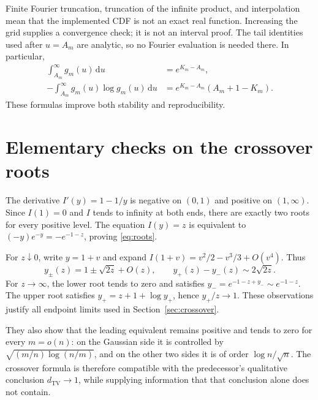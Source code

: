 \documentclass[11pt,a4paper]{article}
\numberwithin{equation}{section}
\theoremstyle{definition}
\theoremstyle{remark}
\newcommand{\TV}{d_{\mathrm{TV}}}
\newcommand{\dd}{\mathrm d}
\begin{document}
Finite Fourier truncation, truncation of the infinite product, and
interpolation mean that the implemented CDF is not an exact real
function. Increasing the grid supplies a convergence check; it is not
an interval proof. The tail identities used after $u=A_m$ are analytic,
so no Fourier evaluation is needed there. In particular,
\begin{align*}
\int_{A_m}^\infty g_m(u)\,\dd u&=e^{K_m-A_m},\\
-\int_{A_m}^\infty g_m(u)\log g_m(u)\,\dd u
 &=e^{K_m-A_m}(A_m+1-K_m).
\end{align*}
These formulas improve both stability and reproducibility.

\section{Elementary checks on the crossover roots}
\label{app:roots}

The derivative $I'(y)=1-1/y$ is negative on $(0,1)$ and positive on
$(1,\infty)$. Since $I(1)=0$ and $I$ tends to infinity at both ends,
there are exactly two roots for every positive level. The equation
$I(y)=z$ is equivalent to $(-y)e^{-y}=-e^{-1-z}$, proving
\eqref{eq:roots}.

For $z\downarrow0$, write $y=1+v$ and expand
$I(1+v)=v^2/2-v^3/3+O(v^4)$. Thus
\[
y_\pm(z)=1\pm\sqrt{2z}+O(z),\qquad
 y_+(z)-y_-(z)\sim2\sqrt{2z}.
\]
For $z\to\infty$, the lower root tends to zero and satisfies
$y_-=e^{-1-z+y_-}\sim e^{-1-z}$. The upper root satisfies
$y_+=z+1+\log y_+$, hence $y_+/z\to1$. These observations justify all
endpoint limits used in Section~\ref{sec:crossover}.

They also show that the leading equivalent remains positive and tends
to zero for every $m=o(n)$: on the Gaussian side it is controlled by
$\sqrt{(m/n)\log(n/m)}$, and on the other two sides it is of order
$\log n/\sqrt n$. The crossover formula is therefore compatible with
the predecessor's qualitative conclusion $\TV\to1$, while supplying
information that that conclusion alone does not contain.
\end{document}
